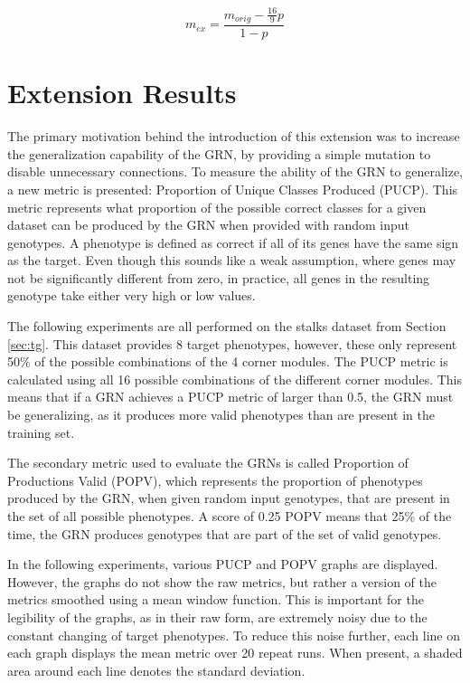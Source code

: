 \documentclass[twocolumn,a4paper,11pt]{article}
\begin{document}
    \begin{equation}
        m_{ex} = \frac{m_{orig} - \frac{16}{9}p}{1-p}
        \label{eq:rate-of-sign}
    \end{equation}

    \section{Extension Results}

    The primary motivation behind the introduction of this extension was to increase the generalization capability of the GRN, by providing a simple mutation to disable unnecessary connections. To measure the ability of the GRN to generalize, a new metric is presented: Proportion of Unique Classes Produced (PUCP). This metric represents what proportion of the possible correct classes for a given dataset can be produced by the GRN when provided with random input genotypes. A phenotype is defined as correct if all of its genes have the same sign as the target. Even though this sounds like a weak assumption, where genes may not be significantly different from zero, in practice, all genes in the resulting genotype take either very high or low values.

    The following experiments are all performed on the stalks dataset from Section \ref{sec:tg}. This dataset provides 8 target phenotypes, however, these only represent 50\% of the possible combinations of the 4 corner modules. The PUCP metric is calculated using all 16 possible combinations of the different corner modules. This means that if a GRN achieves a PUCP metric of larger than 0.5, the GRN must be generalizing, as it produces more valid phenotypes than are present in the training set.

    The secondary metric used to evaluate the GRNs is called Proportion of Productions Valid (POPV), which represents the proportion of phenotypes produced by the GRN, when given random input genotypes, that are present in the set of all possible phenotypes. A score of 0.25 POPV means that 25\% of the time, the GRN produces genotypes that are part of the set of valid genotypes.

    In the following experiments, various PUCP and POPV graphs are displayed. However, the graphs do not show the raw metrics, but rather a version of the metrics smoothed using a mean window function. This is important for the legibility of the graphs, as in their raw form, are extremely noisy due to the constant changing of target phenotypes. To reduce this noise further, each line on each graph displays the mean metric over 20 repeat runs. When present, a shaded area around each line denotes the standard deviation.
\end{document}
